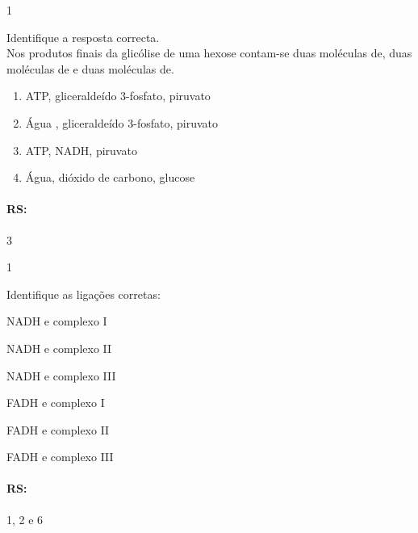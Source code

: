 \documentclass[\mainfilename]{subfiles}
\begin{document}
\begin{questionBox}1{}
    
    Identifique a resposta correcta.\\

    Nos produtos finais da glicólise de uma hexose  contam-se duas moléculas de, duas moléculas de e duas moléculas de.
    \begin{enumerate}
        \item ATP, gliceraldeído 3-fosfato, piruvato
        \item Água , gliceraldeído 3-fosfato, piruvato
        \item ATP, NADH, piruvato 
        \item Água, dióxido de carbono, glucose 
    \end{enumerate}

    \paragraph{RS:} 3
    
\end{questionBox}

\begin{questionBox}1{}
    
    Identifique as ligações corretas:
    \begin{enumerate}
        \begin{multicols}{2}
            \item NADH e complexo I 
            \item NADH e complexo II 
            \item NADH e complexo III
            \item FADH e complexo I
            \item FADH e complexo II 
            \item FADH e complexo III
        \end{multicols}
    \end{enumerate}

    \paragraph{RS:} 1, 2 e 6
    
\end{questionBox}
\end{document}
